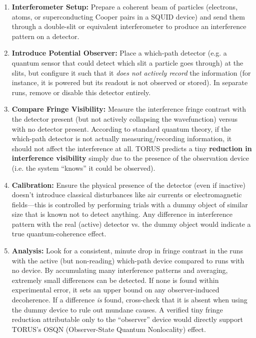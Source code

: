 \begin{enumerate}
\def\labelenumi{\arabic{enumi}.}
\setcounter{enumi}{5}
\item
  \textbf{Interferometer Setup:} Prepare a coherent beam of particles
  (electrons, atoms, or superconducting Cooper pairs in a SQUID device)
  and send them through a double-slit or equivalent interferometer to
  produce an interference pattern on a detector.
\item
  \textbf{Introduce Potential Observer:} Place a which-path detector
  (e.g. a quantum sensor that could detect which slit a particle goes
  through) at the slits, but configure it such that it \emph{does not
  actively record} the information (for instance, it is powered but its
  readout is not observed or stored). In separate runs, remove or
  disable this detector entirely.
\item
  \textbf{Compare Fringe Visibility:} Measure the interference fringe
  contrast with the detector present (but not actively collapsing the
  wavefunction) versus with no detector present. According to standard
  quantum theory, if the which-path detector is not actually
  measuring/recording information, it should not affect the interference
  at all. TORUS predicts a tiny \textbf{reduction in interference
  visibility} simply due to the presence of the observation device (i.e.
  the system ``knows'' it could be observed)​.
\item
  \textbf{Calibration:} Ensure the physical presence of the detector
  (even if inactive) doesn't introduce classical disturbances like air
  currents or electromagnetic fields---this is controlled by performing
  trials with a dummy object of similar size that is known not to detect
  anything. Any difference in interference pattern with the real
  (active) detector vs. the dummy object would indicate a true
  quantum-coherence effect.
\item
  \textbf{Analysis:} Look for a consistent, minute drop in fringe
  contrast in the runs with the active (but non-reading) which-path
  device compared to runs with no device. By accumulating many
  interference patterns and averaging, extremely small differences can
  be detected. If none is found within experimental error, it sets an
  upper bound on any observer-induced decoherence. If a difference
  \emph{is} found, cross-check that it is absent when using the dummy
  device to rule out mundane causes. A verified tiny fringe reduction
  attributable only to the ``observer'' device would directly support
  TORUS's OSQN (Observer-State Quantum Nonlocality) effect.
\end{enumerate}

